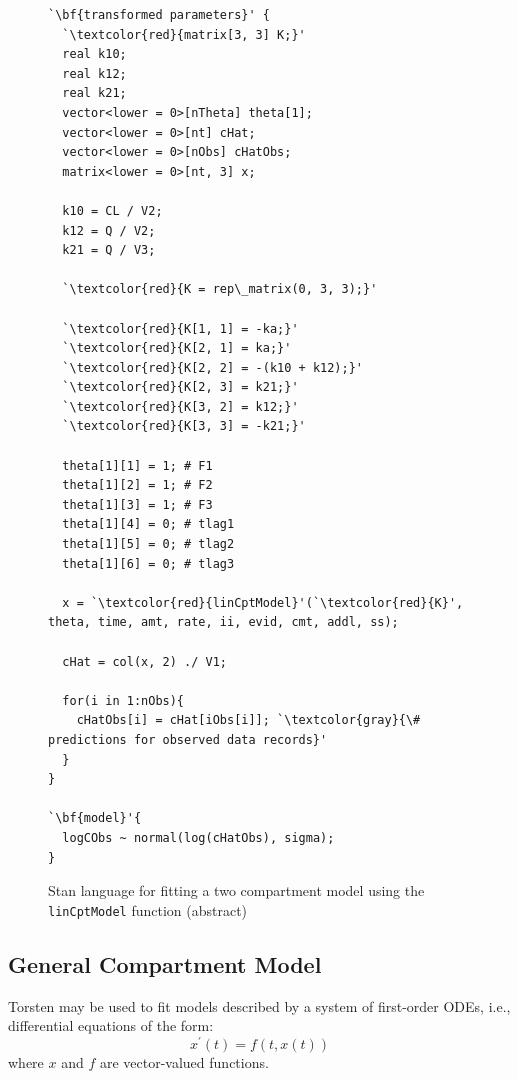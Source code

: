\documentclass[11pt]{amsart}
\newenvironment{fmpage}[1]
     {\begin{lrbox}{\fmbox}\begin{minipage}{#1}}
     {\end{minipage}\end{lrbox}\fbox{\usebox{\fmbox}}}
\begin{document}
\begin{figure}
\caption{Stan language for fitting a two compartment model using the \texttt{linCptModel} function (abstract)}
\begin{center}
\begin{small}
\begin{fmpage}{\textwidth - .75in}
\begin{lstlisting}[basicstyle=\footnotesize\ttfamily,mathescape=true,flexiblecolumns=true,frame=single,escapeinside=`']
`\bf{transformed parameters}' {
  `\textcolor{red}{matrix[3, 3] K;}'
  real k10;
  real k12;
  real k21;
  vector<lower = 0>[nTheta] theta[1];
  vector<lower = 0>[nt] cHat;
  vector<lower = 0>[nObs] cHatObs;
  matrix<lower = 0>[nt, 3] x;
  
  k10 = CL / V2;
  k12 = Q / V2;
  k21 = Q / V3;
 
  `\textcolor{red}{K = rep\_matrix(0, 3, 3);}'

  `\textcolor{red}{K[1, 1] = -ka;}'  
  `\textcolor{red}{K[2, 1] = ka;}' 
  `\textcolor{red}{K[2, 2] = -(k10 + k12);}' 
  `\textcolor{red}{K[2, 3] = k21;}' 
  `\textcolor{red}{K[3, 2] = k12;}' 
  `\textcolor{red}{K[3, 3] = -k21;}'

  theta[1][1] = 1; # F1
  theta[1][2] = 1; # F2
  theta[1][3] = 1; # F3
  theta[1][4] = 0; # tlag1
  theta[1][5] = 0; # tlag2
  theta[1][6] = 0; # tlag3

  x = `\textcolor{red}{linCptModel}'(`\textcolor{red}{K}', theta, time, amt, rate, ii, evid, cmt, addl, ss);

  cHat = col(x, 2) ./ V1;

  for(i in 1:nObs){
    cHatObs[i] = cHat[iObs[i]]; `\textcolor{gray}{\# predictions for observed data records}'
  }
}

`\bf{model}'{
  logCObs ~ normal(log(cHatObs), sigma);
}
\end{lstlisting}
\end{fmpage}
\end{small}
\end{center}
\label{LinTwoCptCode}
\end{figure}

\subsection*{General Compartment Model}

Torsten may be used to fit models described by a system of first-order ODEs, i.e., differential equations of the form:
$$ x^\prime\left(t\right) = f\left(t, x\left(t\right)\right) $$
where $x$ and $f$ are vector-valued functions.
\end{document}
